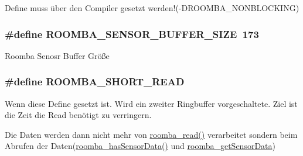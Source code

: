 Define muss über den Compiler gesetzt werden!(-\/\-D\-R\-O\-O\-M\-B\-A\-\_\-\-N\-O\-N\-B\-L\-O\-C\-K\-I\-N\-G) \hypertarget{group__reader_gab5ab726f0bd857186141a6e7659f75df}{
\subsubsection[{R\-O\-O\-M\-B\-A\-\_\-\-S\-E\-N\-S\-O\-R\-\_\-\-B\-U\-F\-F\-E\-R\-\_\-\-S\-I\-Z\-E}]{\setlength{\rightskip}{0pt plus 5cm}\#define R\-O\-O\-M\-B\-A\-\_\-\-S\-E\-N\-S\-O\-R\-\_\-\-B\-U\-F\-F\-E\-R\-\_\-\-S\-I\-Z\-E~173}}\label{group__reader_gab5ab726f0bd857186141a6e7659f75df}
Roomba Senosr Buffer Größe \hypertarget{group__reader_ga6c7a085dd8b07086302a3522eacb1d7b}{
\subsubsection[{R\-O\-O\-M\-B\-A\-\_\-\-S\-H\-O\-R\-T\-\_\-\-R\-E\-A\-D}]{\setlength{\rightskip}{0pt plus 5cm}\#define R\-O\-O\-M\-B\-A\-\_\-\-S\-H\-O\-R\-T\-\_\-\-R\-E\-A\-D}}\label{group__reader_ga6c7a085dd8b07086302a3522eacb1d7b}
Wenn diese Define gesetzt ist. Wird ein zweiter Ringbuffer vorgeschaltete. Ziel ist die Zeit die Read benötigt zu verringern.

Die Daten werden dann nicht mehr von \hyperlink{group__reader_ga0174eded302cf02ac49a990e385cfe90}{roomba\-\_\-read()} verarbeitet sondern beim Abrufen der Daten(\hyperlink{group__reader_ga5e82acf96df5ac30063b6abbcbeeeea9}{roomba\-\_\-has\-Sensor\-Data()} und \hyperlink{group__reader_ga3082696b4e010cc447298466b4f6d90b}{roomba\-\_\-get\-Sensor\-Data})


